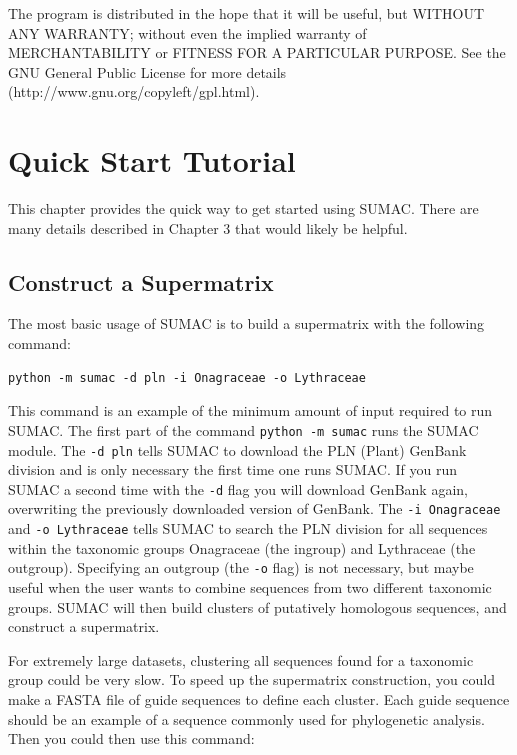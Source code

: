 \documentclass[10pt]{report}
\begin{document}
The program is distributed in the hope that it will be useful, but WITHOUT ANY WARRANTY; without even the implied warranty of MERCHANTABILITY or FITNESS FOR A PARTICULAR PURPOSE. See the GNU General Public License for more details \\ (http://www.gnu.org/copyleft/gpl.html).


\chapter{Quick Start Tutorial}

This chapter provides the quick way to get started using SUMAC. 
There are many details described in Chapter 3 that
would likely be helpful.

\section{Construct a Supermatrix}

The most basic usage of SUMAC is to build a supermatrix with the following
command:

\begin{verbatim}
python -m sumac -d pln -i Onagraceae -o Lythraceae
\end{verbatim}

This command is an example of the minimum amount of input required
to run SUMAC. The first part of the command \texttt{python -m sumac}
runs the SUMAC module. The \texttt{-d pln}
tells SUMAC to download the PLN (Plant) GenBank division and is only necessary the first time one runs SUMAC. 
If you run SUMAC a second time with the \texttt{-d} flag you will download 
GenBank again, overwriting the previously downloaded version of GenBank.
The \texttt{-i Onagraceae} and \texttt{-o Lythraceae}
tells SUMAC to search the PLN division for all sequences within
the taxonomic groups Onagraceae (the ingroup) and Lythraceae (the outgroup).
Specifying an outgroup (the \texttt{-o} flag) is not necessary, 
but maybe useful when the user wants to combine sequences from two
different taxonomic groups.
SUMAC will then
build clusters of putatively homologous sequences, and 
construct a supermatrix. 

For extremely large datasets, clustering all sequences found
for a taxonomic group could be very slow.
To speed up the supermatrix construction, you could make a FASTA file
of guide sequences to define each cluster. Each guide
sequence should be an example of a sequence commonly used for phylogenetic
analysis. Then you could then use this command:
\end{document}
